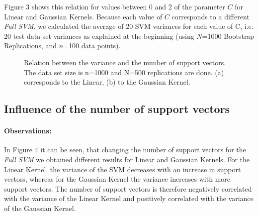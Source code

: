\documentclass[a4paper]{article}
\begin{document}
Figure 3 shows this relation for values between 0 and 2 of the parameter $C$ 
for Linear and Gaussian Kernels. Because each value of $C$ corresponds to a different \textit{Full SVM}, we calculated the average of 20 SVM variances for each value of C, i.e. 20 test data set variances as explained at the beginning (using $N$=1000 Bootstrap Replications, and $n$=100 data points).
 
\begin{figure}[!htb]
\begin{center}

\caption{Relation between the variance and the number of support vectors. The data set size is n=1000 and N=500 replications are done. (a) corresponds to the Linear, (b) to the Gaussian Kernel.}
\label{fig4}
\end{center}
\end{figure}


\subsection{Influence of the number of support vectors}
\paragraph{Observations:}
In Figure 4\label{fig4} it can be seen, that changing the number of support vectors for the \textit{Full SVM} we obtained different results for Linear and Gaussian Kernels. For the Linear Kernel, the variance of the SVM decreases with an increase in support vectors, whereas for the Gaussian Kernel the variance increases with more support vectors. The number of support vectors is therefore negatively correlated with the variance of the Linear Kernel and positively correlated with the variance of the Gaussian Kernel.
\end{document}
